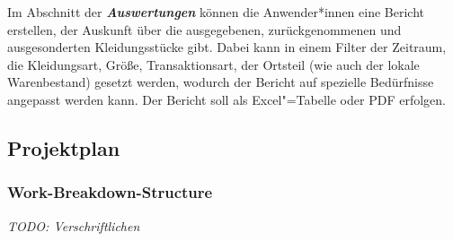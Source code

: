 Im Abschnitt der \textit{\textbf{Auswertungen}} können die Anwender*innen eine Bericht erstellen, der Auskunft über die ausgegebenen, zurückgenommenen und ausgesonderten Kleidungsstücke gibt. Dabei kann in einem Filter der Zeitraum, die Kleidungsart, Größe, Transaktionsart, der Ortsteil (wie auch der lokale Warenbestand) gesetzt werden, wodurch der Bericht auf spezielle Bedürfnisse angepasst werden kann. Der Bericht soll als Excel"=Tabelle oder PDF erfolgen.

\subsection{Projektplan}
\subsubsection{Work-Breakdown-Structure}\label{sec:wbs}

\textit{TODO: Verschriftlichen}

